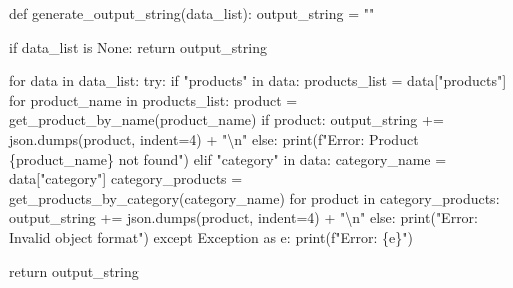 \documentclass[
  letterpaper,
  DIV=11,
  numbers=noendperiod]{scrreprt}
\newenvironment{Shaded}{\begin{snugshade}}{\end{snugshade}}
\newcommand{\BuiltInTok}[1]{\textcolor[rgb]{0.00,0.23,0.31}{#1}}
\newcommand{\CharTok}[1]{\textcolor[rgb]{0.13,0.47,0.30}{#1}}
\newcommand{\ControlFlowTok}[1]{\textcolor[rgb]{0.00,0.23,0.31}{#1}}
\newcommand{\DecValTok}[1]{\textcolor[rgb]{0.68,0.00,0.00}{#1}}
\newcommand{\ImportTok}[1]{\textcolor[rgb]{0.00,0.46,0.62}{#1}}
\newcommand{\KeywordTok}[1]{\textcolor[rgb]{0.00,0.23,0.31}{#1}}
\newcommand{\NormalTok}[1]{\textcolor[rgb]{0.00,0.23,0.31}{#1}}
\newcommand{\OperatorTok}[1]{\textcolor[rgb]{0.37,0.37,0.37}{#1}}
\newcommand{\PreprocessorTok}[1]{\textcolor[rgb]{0.68,0.00,0.00}{#1}}
\newcommand{\SpecialCharTok}[1]{\textcolor[rgb]{0.37,0.37,0.37}{#1}}
\newcommand{\SpecialStringTok}[1]{\textcolor[rgb]{0.13,0.47,0.30}{#1}}
\newcommand{\StringTok}[1]{\textcolor[rgb]{0.13,0.47,0.30}{#1}}
\newcommand{\VariableTok}[1]{\textcolor[rgb]{0.07,0.07,0.07}{#1}}
\begin{document}
\begin{Shaded}
\begin{Highlighting}[]
\KeywordTok{def}\NormalTok{ generate\_output\_string(data\_list):}
\NormalTok{    output\_string }\OperatorTok{=} \StringTok{""}

    \ControlFlowTok{if}\NormalTok{ data\_list }\KeywordTok{is} \VariableTok{None}\NormalTok{:}
        \ControlFlowTok{return}\NormalTok{ output\_string}

    \ControlFlowTok{for}\NormalTok{ data }\KeywordTok{in}\NormalTok{ data\_list:}
        \ControlFlowTok{try}\NormalTok{:}
            \ControlFlowTok{if} \StringTok{"products"} \KeywordTok{in}\NormalTok{ data:}
\NormalTok{                products\_list }\OperatorTok{=}\NormalTok{ data[}\StringTok{"products"}\NormalTok{]}
                \ControlFlowTok{for}\NormalTok{ product\_name }\KeywordTok{in}\NormalTok{ products\_list:}
\NormalTok{                    product }\OperatorTok{=}\NormalTok{ get\_product\_by\_name(product\_name)}
                    \ControlFlowTok{if}\NormalTok{ product:}
\NormalTok{                        output\_string }\OperatorTok{+=}\NormalTok{ json.dumps(product, indent}\OperatorTok{=}\DecValTok{4}\NormalTok{) }\OperatorTok{+} \StringTok{"}\CharTok{\textbackslash{}n}\StringTok{"}
                    \ControlFlowTok{else}\NormalTok{:}
                        \BuiltInTok{print}\NormalTok{(}\SpecialStringTok{f"Error: Product \textquotesingle{}}\SpecialCharTok{\{}\NormalTok{product\_name}\SpecialCharTok{\}}\SpecialStringTok{\textquotesingle{} not found"}\NormalTok{)}
            \ControlFlowTok{elif} \StringTok{"category"} \KeywordTok{in}\NormalTok{ data:}
\NormalTok{                category\_name }\OperatorTok{=}\NormalTok{ data[}\StringTok{"category"}\NormalTok{]}
\NormalTok{                category\_products }\OperatorTok{=}\NormalTok{ get\_products\_by\_category(category\_name)}
                \ControlFlowTok{for}\NormalTok{ product }\KeywordTok{in}\NormalTok{ category\_products:}
\NormalTok{                    output\_string }\OperatorTok{+=}\NormalTok{ json.dumps(product, indent}\OperatorTok{=}\DecValTok{4}\NormalTok{) }\OperatorTok{+} \StringTok{"}\CharTok{\textbackslash{}n}\StringTok{"}
            \ControlFlowTok{else}\NormalTok{:}
                \BuiltInTok{print}\NormalTok{(}\StringTok{"Error: Invalid object format"}\NormalTok{)}
        \ControlFlowTok{except} \PreprocessorTok{Exception} \ImportTok{as}\NormalTok{ e:}
            \BuiltInTok{print}\NormalTok{(}\SpecialStringTok{f"Error: }\SpecialCharTok{\{}\NormalTok{e}\SpecialCharTok{\}}\SpecialStringTok{"}\NormalTok{)}

    \ControlFlowTok{return}\NormalTok{ output\_string}
\end{Highlighting}
\end{Shaded}
\end{document}
